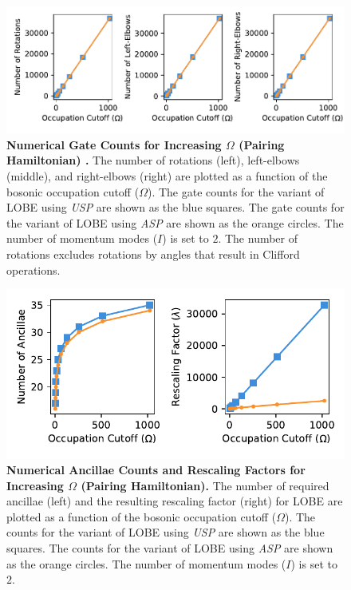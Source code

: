 \begin{figure}
    \centering
    \includegraphics[width=16cm]{figures/pairing_hamiltonian_gates_vs_omega.pdf}
    \caption{
        \textbf{Numerical Gate Counts for Increasing $\Omega$ (Pairing Hamiltonian) .}
        The number of rotations (left), left-elbows (middle), and right-elbows (right) are plotted as a function of the bosonic occupation cutoff ($\Omega$).
        The gate counts for the variant of LOBE using \textit{USP} are shown as the blue squares.
        The gate counts for the variant of LOBE using \textit{ASP} are shown as the orange circles.
        The number of momentum modes ($I$) is set to $2$.
        The number of rotations excludes rotations by angles that result in Clifford operations.
    }
    \label{fig:pairing_hamiltonian_gates_vs_omega}
\end{figure}
\begin{figure}
    \centering
    \includegraphics[width=12cm]{figures/pairing_hamiltonian_qubits_and_rescaling_vs_omega.pdf}
    \caption{
        \textbf{Numerical Ancillae Counts and Rescaling Factors for Increasing $\Omega$ (Pairing Hamiltonian).}
        The number of required ancillae (left) and the resulting rescaling factor (right) for LOBE are plotted as a function of the bosonic occupation cutoff ($\Omega$).
        The counts for the variant of LOBE using \textit{USP} are shown as the blue squares.
        The counts for the variant of LOBE using \textit{ASP} are shown as the orange circles.
        The number of momentum modes ($I$) is set to $2$.
    }
    \label{fig:pairing_hamiltonian_qubits_and_rescaling_vs_omega}
\end{figure}

